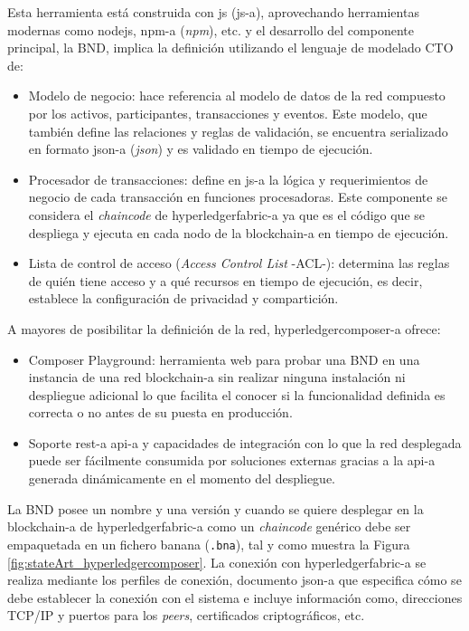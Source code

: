 \documentclass[12pt,a4paper, twoside]{report}
\begin{document}
	Esta herramienta está construida con \gls{js} (\gls{js-a}), aprovechando herramientas modernas como \gls{nodejs}, \gls{npm-a} (\textit{\gls{npm}}), etc. y el desarrollo del componente principal, la BND, implica la definición utilizando el lenguaje de modelado CTO de:
	
	\begin{itemize}
		\item Modelo de negocio: hace referencia al modelo de datos de la red compuesto por los activos, participantes, transacciones y eventos. Este modelo, que también define las relaciones y reglas de validación, se encuentra serializado en formato \gls{json-a} (\textit{\gls{json}}) y es validado en tiempo de ejecución. 
		
		\item Procesador de transacciones: define en \gls{js-a} la lógica y requerimientos de negocio de cada transacción en funciones procesadoras. Este componente se considera el \textit{\gls{chaincode}} de \gls{hyperledgerfabric-a} ya que es el código que se despliega y ejecuta en cada nodo de la \gls{blockchain-a} en tiempo de ejecución.
	
		\item Lista de control de acceso (\textit{Access Control List} -ACL-): determina las reglas de quién tiene acceso y a qué recursos en tiempo de ejecución, es decir, establece la configuración de privacidad y compartición.
	\end{itemize}

	A mayores de posibilitar la definición de la red, \gls{hyperledgercomposer-a} ofrece:

	\begin{itemize}
		\item Composer Playground: herramienta web para probar una BND en una instancia de una red \gls{blockchain-a} sin realizar ninguna instalación ni despliegue adicional lo que facilita el conocer si la funcionalidad definida es correcta o no antes de su puesta en producción.
		\item Soporte \gls{rest-a} \gls{api-a} y capacidades de integración con lo que la red desplegada puede ser fácilmente consumida por soluciones externas gracias a la \gls{api-a} generada dinámicamente en el momento del despliegue.
	\end{itemize}
	
	La BND posee un nombre y una versión y cuando se quiere desplegar en la \gls{blockchain-a} de \gls{hyperledgerfabric-a} como un \textit{\gls{chaincode}} genérico debe ser empaquetada en un fichero banana (\texttt{.bna}), tal y como muestra la Figura \ref{fig:stateArt_hyperledgercomposer}. La conexión con \gls{hyperledgerfabric-a} se realiza mediante los perfiles de conexión, documento \gls{json-a} que especifica cómo se debe establecer la conexión con el sistema e incluye información como, direcciones TCP/IP y puertos para los \textit{peers}, certificados criptográficos, etc.
	
\end{document}

